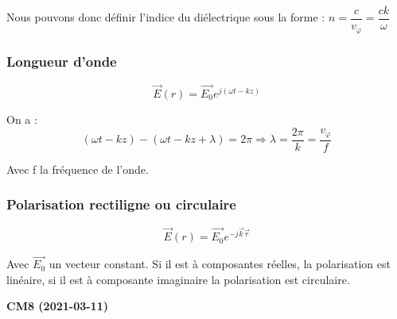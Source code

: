 \documentclass[12pt,a4paper]{report}
\begin{document}
Nous pouvons donc définir l'indice du diélectrique sous la forme : \(n = \dfrac{c}{v_\varphi} = \dfrac{ck}{\omega}\)

\subsubsection{Longueur d'onde}

\[
	\vec{E}(r) = \vec{E_0} e^{j(\omega t - k z)}
\]

On a : 
\[
	(\omega t - k z) - (\omega t - k z + \lambda) = 2\pi \Rightarrow \lambda = \dfrac{2\pi}{k} = \dfrac{v_\varphi}{f}
\]

Avec f la fréquence de l'onde.

\subsubsection{Polarisation rectiligne ou circulaire}

\[
	\vec{E}(r) = \vec{E_0} e^{-j \vec{k} \vec{r}}
\]

Avec \(\vec{E_0}\) un vecteur constant. Si il est à composantes réelles, la polarisation est linéaire, si il est à composante imaginaire la polarisation est circulaire.

\begin{center}
\textbf{CM8 (2021-03-11)}
\end{center}
\end{document}
